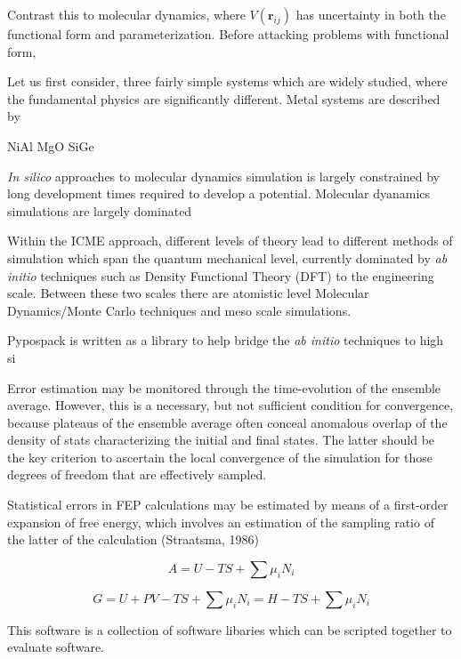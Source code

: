 Contrast this to molecular dynamics, where $V(\bm{r}_{ij})$ has uncertainty in both the functional form and parameterization.  Before attacking problems with functional form,

Let us first consider, three fairly simple systems which are widely studied, where the fundamental physics are significantly different.  Metal systems are described by

NiAl
MgO
SiGe

\emph{In silico} approaches to molecular dynamics simulation is largely constrained by long development times required to develop a potential.  Molecular dyanamics simulations are largely dominated

Within the ICME approach, different levels of theory lead to different methods of simulation which span the quantum mechanical level, currently dominated by \emph{ab initio} techniques such as Density Functional Theory (DFT) to the engineering scale.  Between these two scales there are atomistic level Molecular Dynamics/Monte Carlo techniques and meso scale simulations.

Pypospack is written as a library to help bridge the \emph{ab initio} techniques to high si



Error estimation may be monitored through the time-evolution of the ensemble average.  However, this is a necessary, but not sufficient condition for convergence, because plateaus of the ensemble average often conceal anomalous overlap of the density of stats characterizing the initial and final states.  The latter should be the key criterion to ascertain the local convergence of the simulation for those degrees of freedom that are effectively sampled.

Statistical errors in FEP calculations may be estimated by means of a first-order expansion of free energy, which involves an estimation of the sampling ratio of the latter of the calculation (Straatsma, 1986)

\begin{equation}\label{eq:helmoholtz_free_energy}
  A = U-TS + \sum \mu_i N_i
\end{equation}

\begin{equation}\label{eq:gibbs_free_energy}
  G = U+PV-TS + \sum \mu_i N_i = H - TS + \sum \mu_i N_i
\end{equation}

This software is a collection of software libaries which can be scripted together to evaluate software.


